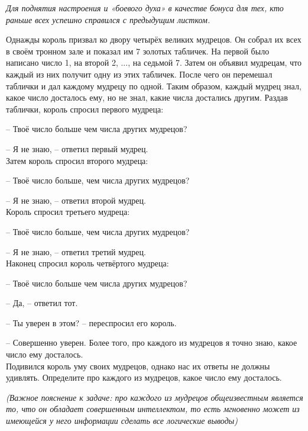 
\textit{Для поднятия настроения и «боевого духа» в качестве бонуса для тех, кто раньше всех успешно
справился с предыдущим листком.}

\begin{thmF}
    Однажды король призвал ко двору четырёх великих мудрецов. Он собрал их всех в своём тронном зале и показал им 7 золотых табличек. На первой было написано число 1, на второй 2, ..., на седьмой 7. Затем он объявил мудрецам, что каждый из них получит одну из этих табличек. После чего он перемешал таблички и дал каждому мудрецу по одной. Таким образом, каждый мудрец знал, какое число досталось ему, но не знал, какие числа достались другим. Раздав таблички, король спросил первого мудреца: 
    \par -- Твоё число больше чем числа других мудрецов?
    \par -- Я не знаю, -- ответил первый мудрец. 
    \\ Затем король спросил второго мудреца: 
    \par -- Твоё число больше, чем числа других мудрецов?
    \par -- Я не знаю, -- ответил второй мудрец.
    \\ Король спросил третьего мудреца: 
    \par -- Твоё число больше, чем числа других мудрецов? 
    \par -- Я не знаю, -- ответил третий мудрец.
    \\ Наконец спросил король четвёртого мудреца: 
    \par -- Твоё число больше чем числа других мудрецов?
    \par -- Да, -- ответил тот. 
    \par -- Ты уверен в этом? -- переспросил его король. 
    \par -- Совершенно уверен. Более того, про каждого из мудрецов я точно знаю, какое число ему досталось.
    \\ Подивился король уму своих мудрецов, однако нас их ответы не должны удивлять. Определите про каждого из мудрецов, какое число ему досталось. 
\end{thmF}
{\footnotesize \textit{(Важное пояснение к задаче: про каждого из мудрецов общеизвестным является то, что он обладает совершенным интеллектом, то есть мгновенно может из имеющейся у него информации сделать все логические выводы)}}

